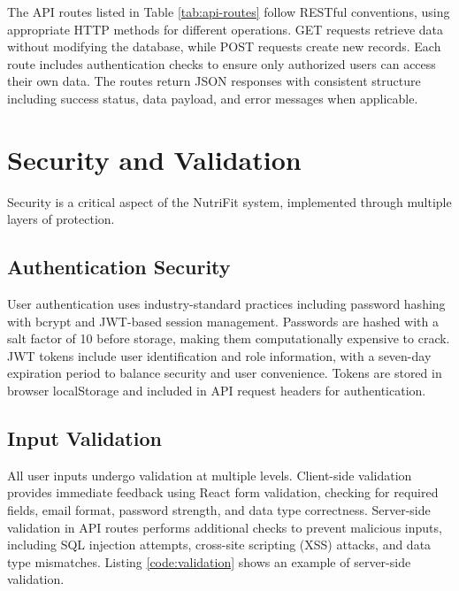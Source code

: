 The API routes listed in Table \ref{tab:api-routes} follow RESTful conventions, using appropriate HTTP methods for different operations. GET requests retrieve data without modifying the database, while POST requests create new records. Each route includes authentication checks to ensure only authorized users can access their own data. The routes return JSON responses with consistent structure including success status, data payload, and error messages when applicable.

\section{Security and Validation}

Security is a critical aspect of the NutriFit system, implemented through multiple layers of protection.

\subsection{Authentication Security}

User authentication uses industry-standard practices including password hashing with bcrypt and JWT-based session management. Passwords are hashed with a salt factor of 10 before storage, making them computationally expensive to crack. JWT tokens include user identification and role information, with a seven-day expiration period to balance security and user convenience. Tokens are stored in browser localStorage and included in API request headers for authentication.

\subsection{Input Validation}

All user inputs undergo validation at multiple levels. Client-side validation provides immediate feedback using React form validation, checking for required fields, email format, password strength, and data type correctness. Server-side validation in API routes performs additional checks to prevent malicious inputs, including SQL injection attempts, cross-site scripting (XSS) attacks, and data type mismatches. Listing \ref{code:validation} shows an example of server-side validation.

